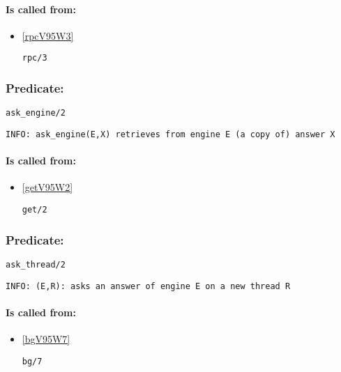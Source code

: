 \paragraph{Is called from:} 
\begin{itemize}
\item \ref{rpcV95W3} 
\begin{verbatim}
rpc/3
\end{verbatim}

\end{itemize}

\subsubsection{Predicate:} \label{askV95WengineV95W2}

\begin{verbatim}
ask_engine/2
\end{verbatim}

{\small \begin{verbatim}
INFO: ask_engine(E,X) retrieves from engine E (a copy of) answer X

\end{verbatim}}
\paragraph{Is called from:} 
\begin{itemize}
\item \ref{getV95W2} 
\begin{verbatim}
get/2
\end{verbatim}

\end{itemize}

\subsubsection{Predicate:} \label{askV95WthreadV95W2}

\begin{verbatim}
ask_thread/2
\end{verbatim}

{\small \begin{verbatim}
INFO: (E,R): asks an answer of engine E on a new thread R

\end{verbatim}}
\paragraph{Is called from:} 
\begin{itemize}
\item \ref{bgV95W7} 
\begin{verbatim}
bg/7
\end{verbatim}

\end{itemize}

